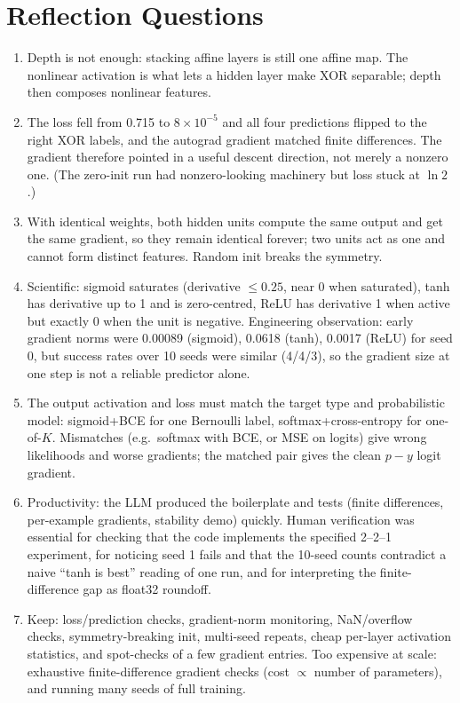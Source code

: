 \documentclass[10pt,a4paper]{article}
\begin{document}
\section*{Reflection Questions}
\begin{enumerate}[leftmargin=*]
\item Depth is not enough: stacking affine layers is still one affine map. The nonlinear activation is what lets a hidden layer make XOR separable; depth then composes nonlinear features.
\item The loss fell from 0.715 to $8\times10^{-5}$ and all four predictions flipped to the right XOR labels, and the autograd gradient matched finite differences. The gradient therefore pointed in a useful descent direction, not merely a nonzero one. (The zero-init run had nonzero-looking machinery but loss stuck at $\ln2$.)
\item With identical weights, both hidden units compute the same output and get the same gradient, so they remain identical forever; two units act as one and cannot form distinct features. Random init breaks the symmetry.
\item Scientific: sigmoid saturates (derivative $\le0.25$, near 0 when saturated), tanh has derivative up to 1 and is zero-centred, ReLU has derivative 1 when active but exactly 0 when the unit is negative. Engineering observation: early gradient norms were 0.00089 (sigmoid), 0.0618 (tanh), 0.0017 (ReLU) for seed 0, but success rates over 10 seeds were similar (4/4/3), so the gradient size at one step is not a reliable predictor alone.
\item The output activation and loss must match the target type and probabilistic model: sigmoid+BCE for one Bernoulli label, softmax+cross-entropy for one-of-$K$. Mismatches (e.g.\ softmax with BCE, or MSE on logits) give wrong likelihoods and worse gradients; the matched pair gives the clean $p-y$ logit gradient.
\item Productivity: the LLM produced the boilerplate and tests (finite differences, per-example gradients, stability demo) quickly. Human verification was essential for checking that the code implements the specified 2--2--1 experiment, for noticing seed 1 fails and that the 10-seed counts contradict a naive ``tanh is best'' reading of one run, and for interpreting the finite-difference gap as float32 roundoff.
\item Keep: loss/prediction checks, gradient-norm monitoring, NaN/overflow checks, symmetry-breaking init, multi-seed repeats, cheap per-layer activation statistics, and spot-checks of a few gradient entries. Too expensive at scale: exhaustive finite-difference gradient checks (cost $\propto$ number of parameters), and running many seeds of full training.
\end{enumerate}
\end{document}
